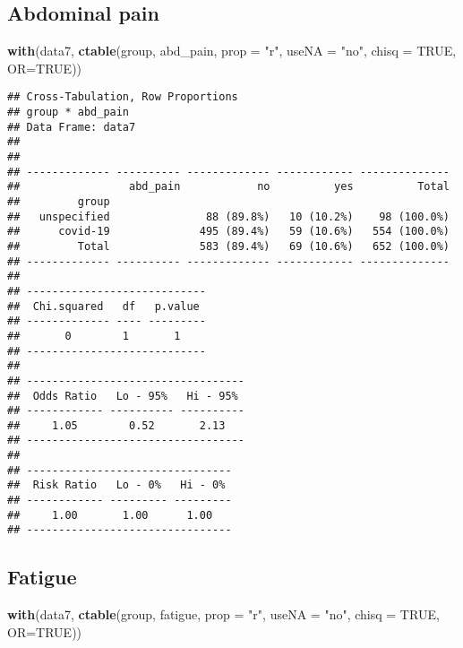 \documentclass[
]{article}
\newenvironment{Shaded}{\begin{snugshade}}{\end{snugshade}}
\newcommand{\DataTypeTok}[1]{\textcolor[rgb]{0.13,0.29,0.53}{#1}}
\newcommand{\KeywordTok}[1]{\textcolor[rgb]{0.13,0.29,0.53}{\textbf{#1}}}
\newcommand{\NormalTok}[1]{#1}
\newcommand{\OtherTok}[1]{\textcolor[rgb]{0.56,0.35,0.01}{#1}}
\newcommand{\StringTok}[1]{\textcolor[rgb]{0.31,0.60,0.02}{#1}}
\begin{document}
\hypertarget{abdominal-pain}{%
\subsection{Abdominal pain}\label{abdominal-pain}}

\begin{Shaded}
\begin{Highlighting}[]
\KeywordTok{with}\NormalTok{(data7, }\KeywordTok{ctable}\NormalTok{(group, abd_pain, }\DataTypeTok{prop =} \StringTok{"r"}\NormalTok{, }\DataTypeTok{useNA =} \StringTok{"no"}\NormalTok{, }\DataTypeTok{chisq =} \OtherTok{TRUE}\NormalTok{, }\DataTypeTok{OR=}\OtherTok{TRUE}\NormalTok{))}
\end{Highlighting}
\end{Shaded}

\begin{verbatim}
## Cross-Tabulation, Row Proportions  
## group * abd_pain  
## Data Frame: data7  
## 
## 
## ------------- ---------- ------------- ------------ --------------
##                 abd_pain            no          yes          Total
##         group                                                     
##   unspecified               88 (89.8%)   10 (10.2%)    98 (100.0%)
##      covid-19              495 (89.4%)   59 (10.6%)   554 (100.0%)
##         Total              583 (89.4%)   69 (10.6%)   652 (100.0%)
## ------------- ---------- ------------- ------------ --------------
## 
## ----------------------------
##  Chi.squared   df   p.value 
## ------------- ---- ---------
##       0        1       1    
## ----------------------------
## 
## ----------------------------------
##  Odds Ratio   Lo - 95%   Hi - 95% 
## ------------ ---------- ----------
##     1.05        0.52       2.13   
## ----------------------------------
## 
## --------------------------------
##  Risk Ratio   Lo - 0%   Hi - 0% 
## ------------ --------- ---------
##     1.00       1.00      1.00   
## --------------------------------
\end{verbatim}

\hypertarget{fatigue}{%
\subsection{Fatigue}\label{fatigue}}

\begin{Shaded}
\begin{Highlighting}[]
\KeywordTok{with}\NormalTok{(data7, }\KeywordTok{ctable}\NormalTok{(group, fatigue, }\DataTypeTok{prop =} \StringTok{"r"}\NormalTok{, }\DataTypeTok{useNA =} \StringTok{"no"}\NormalTok{, }\DataTypeTok{chisq =} \OtherTok{TRUE}\NormalTok{, }\DataTypeTok{OR=}\OtherTok{TRUE}\NormalTok{))}
\end{Highlighting}
\end{Shaded}
\end{document}
